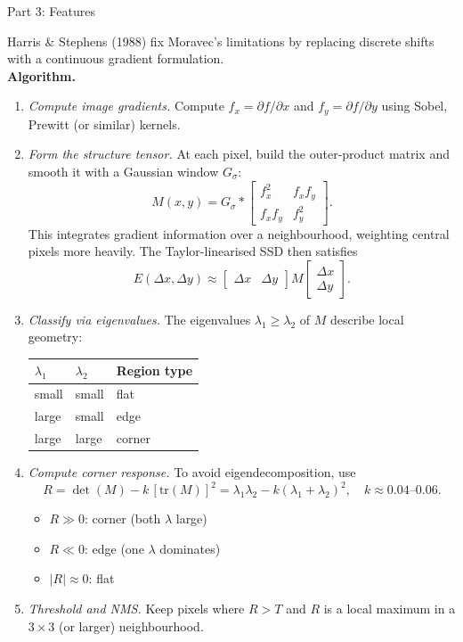\documentclass[letterpaper]{article}
\begin{document}
\begin{notes}{Part 3: Features}

Harris \& Stephens (1988) fix Moravec's limitations by replacing discrete shifts with a continuous gradient formulation.\\

\textbf{Algorithm.}
\begin{enumerate}
    \item \textit{Compute image gradients.} Compute $f_x = \partial f/\partial x$ and $f_y = \partial f/\partial y$ using Sobel, Prewitt (or similar) kernels.
    \item \textit{Form the structure tensor.} At each pixel, build the outer-product matrix and smooth it with a Gaussian window $G_\sigma$:
    $$M(x,y) = G_\sigma * \begin{bmatrix}f_x^2 & f_x f_y \\ f_x f_y & f_y^2\end{bmatrix}.$$
    This integrates gradient information over a neighbourhood, weighting central pixels more heavily. The Taylor-linearised SSD then satisfies
    $$E(\Delta x,\Delta y) \approx \begin{bmatrix}\Delta x & \Delta y\end{bmatrix} M \begin{bmatrix}\Delta x\\\Delta y\end{bmatrix}.$$
    \item \textit{Classify via eigenvalues.} The eigenvalues $\lambda_1 \ge \lambda_2$ of $M$ describe local geometry:
    \begin{center}
    \begin{tabular}{@{}lll@{}}
    \toprule
    $\lambda_1$ & $\lambda_2$ & Region type \\
    \midrule
    small & small & flat \\
    large & small & edge \\
    large & large & corner \\
    \bottomrule
    \end{tabular}
    \end{center}
    \item \textit{Compute corner response.} To avoid eigendecomposition, use
    $$R = \det(M) - k\,[\mathrm{tr}(M)]^2 = \lambda_1\lambda_2 - k(\lambda_1+\lambda_2)^2, \quad k \approx 0.04\text{--}0.06.$$
    \begin{itemize}
        \item $R \gg 0$: corner (both $\lambda$ large)
        \item $R \ll 0$: edge (one $\lambda$ dominates)
        \item $|R| \approx 0$: flat
    \end{itemize}
    \item \textit{Threshold and NMS.} Keep pixels where $R > T$ and $R$ is a local maximum in a $3\times3$ (or larger) neighbourhood.
\end{enumerate}


\end{notes}
\end{document}
